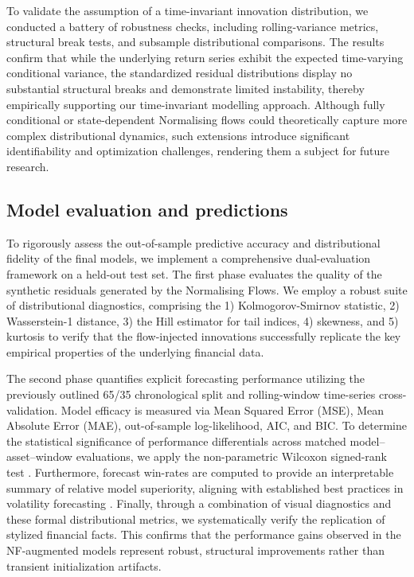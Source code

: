 \documentclass[risks,article,submit,pdftex,moreauthors]{Definitions/mdpi}
\begin{document}
To validate the assumption of a time-invariant innovation distribution, we conducted a battery of robustness checks, including rolling-variance metrics, structural break tests, and subsample distributional comparisons. The results confirm that while the underlying return series exhibit the expected time-varying conditional variance, the standardized residual distributions display no substantial structural breaks and demonstrate limited instability, thereby empirically supporting our time-invariant modelling approach. Although fully conditional or state-dependent Normalising flows could theoretically capture more complex distributional dynamics, such extensions introduce significant identifiability and optimization challenges, rendering them a subject for future research.

\subsection{Model evaluation and predictions} 

To rigorously assess the out-of-sample predictive accuracy and distributional fidelity of the final models, we implement a comprehensive dual-evaluation framework on a held-out test set. The first phase evaluates the quality of the synthetic residuals generated by the Normalising Flows. We employ a robust suite of distributional diagnostics, comprising the 1) Kolmogorov-Smirnov statistic, 2) Wasserstein-1 distance, 3) the Hill estimator for tail indices, 4) skewness, and 5) kurtosis to verify that the flow-injected innovations successfully replicate the key empirical properties of the underlying financial data.

The second phase quantifies explicit forecasting performance utilizing the previously outlined 65/35 chronological split and rolling-window time-series cross-validation. Model efficacy is measured via Mean Squared Error (MSE), Mean Absolute Error (MAE), out-of-sample log-likelihood, AIC, and BIC. To determine the statistical significance of performance differentials across matched model–asset–window evaluations, we apply the non-parametric Wilcoxon signed-rank test \citep{demvsar2006statistical}. Furthermore, forecast win-rates are computed to provide an interpretable summary of relative model superiority, aligning with established best practices in volatility forecasting \citep{amisano2007comparing, ziel2016forecasting}. Finally, through a combination of visual diagnostics and these formal distributional metrics, we systematically verify the replication of stylized financial facts. This confirms that the performance gains observed in the NF-augmented models represent robust, structural improvements rather than transient initialization artifacts.
\end{document}
